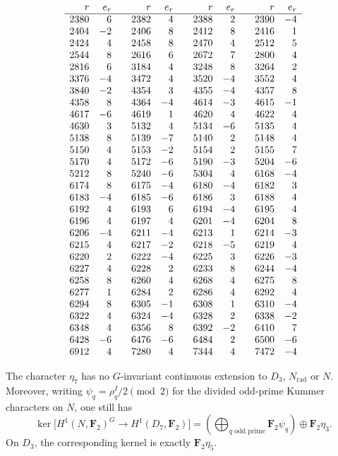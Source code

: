 {\small
\[
\begin{array}{rr@{\qquad}rr@{\qquad}rr@{\qquad}rr}
r&e_r&r&e_r&r&e_r&r&e_r\\ \hline
2380&6&2382&4&2388&2&2390&-4\\
2404&-2&2406&8&2412&8&2416&1\\
2424&4&2458&8&2470&4&2512&5\\
2544&8&2616&6&2672&7&2800&4\\
2816&6&3184&4&3248&8&3264&2\\
3376&-4&3472&4&3520&-4&3552&4\\
3840&-2&4354&3&4355&-4&4357&8\\
4358&8&4364&-4&4614&-3&4615&-1\\
4617&-6&4619&1&4620&4&4622&4\\
4630&3&5132&4&5134&-6&5135&4\\
5138&8&5139&-7&5140&2&5148&4\\
5150&4&5153&-2&5154&2&5155&7\\
5170&4&5172&-6&5190&-3&5204&-6\\
5212&8&5240&-6&5304&4&6168&-4\\
6174&8&6175&-4&6180&-4&6182&3\\
6183&-4&6185&-6&6186&3&6188&4\\
6192&4&6193&6&6194&-4&6195&4\\
6196&4&6197&4&6201&-4&6204&8\\
6206&-4&6211&-4&6213&1&6214&-3\\
6215&4&6217&-2&6218&-5&6219&4\\
6220&2&6222&-4&6225&3&6226&-3\\
6227&4&6228&2&6233&8&6244&-4\\
6258&8&6260&4&6268&4&6275&8\\
6277&1&6284&2&6286&4&6292&4\\
6294&8&6305&-1&6308&1&6310&-4\\
6322&4&6324&-4&6328&2&6338&-2\\
6348&4&6356&8&6392&-2&6410&7\\
6428&-6&6476&-6&6484&2&6500&-6\\
6912&4&7280&4&7344&4&7472&-4\\
\end{array}
\]
}

\begin{corollary}\label{cor:weight-seven-nonextension}
The character $\eta_7$ has no $G$-invariant continuous extension to
$D_3$, $N_{\mathrm{rad}}$ or $N$.
Moreover, writing $\psi_q=\rho_q^I/2\pmod2$ for the divided
odd-prime Kummer characters on $N$, one still has
\[
 \ker\bigl[H^1(N,\mathbf F_2)^G\longrightarrow
                         H^1(D_7,\mathbf F_2)\bigr]
 =\left(\bigoplus_{q\text{ odd prime}}\mathbf F_2\psi_q\right)
       \oplus\mathbf F_2\eta_3.
\]
On $D_3$, the corresponding kernel is exactly $\mathbf F_2\eta_5$.
\end{corollary}


